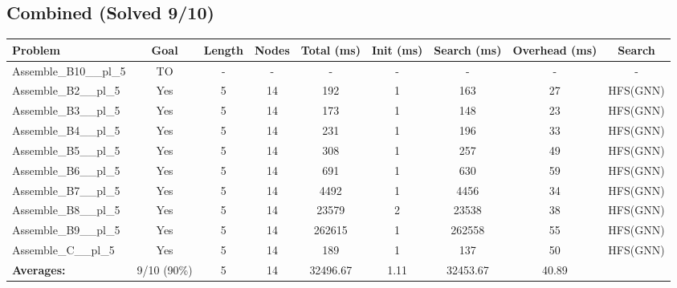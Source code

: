 \documentclass{article}
\begin{document}
\subsection*{Combined (Solved 9/10)}
\begin{tabular}{lcccccccc}
\toprule
Problem & Goal & Length & Nodes & Total (ms) & Init (ms) & Search (ms) & Overhead (ms) & Search \\
\midrule
Assemble\_B10\_\_pl\_5 & TO & - & - & - & - & - & - & - \\
Assemble\_B2\_\_pl\_5 & Yes & 5 & 14 & 192 & 1 & 163 & 27 & HFS(GNN) \\
Assemble\_B3\_\_pl\_5 & Yes & 5 & 14 & 173 & 1 & 148 & 23 & HFS(GNN) \\
Assemble\_B4\_\_pl\_5 & Yes & 5 & 14 & 231 & 1 & 196 & 33 & HFS(GNN) \\
Assemble\_B5\_\_pl\_5 & Yes & 5 & 14 & 308 & 1 & 257 & 49 & HFS(GNN) \\
Assemble\_B6\_\_pl\_5 & Yes & 5 & 14 & 691 & 1 & 630 & 59 & HFS(GNN) \\
Assemble\_B7\_\_pl\_5 & Yes & 5 & 14 & 4492 & 1 & 4456 & 34 & HFS(GNN) \\
Assemble\_B8\_\_pl\_5 & Yes & 5 & 14 & 23579 & 2 & 23538 & 38 & HFS(GNN) \\
Assemble\_B9\_\_pl\_5 & Yes & 5 & 14 & 262615 & 1 & 262558 & 55 & HFS(GNN) \\
Assemble\_C\_\_pl\_5 & Yes & 5 & 14 & 189 & 1 & 137 & 50 & HFS(GNN) \\
\textbf{Averages:} & 9/10 (90\%) & 5 & 14 & 32496.67 & 1.11 & 32453.67 & 40.89 & \\
\bottomrule
\end{tabular}
\\[0.7cm]
\end{document}
